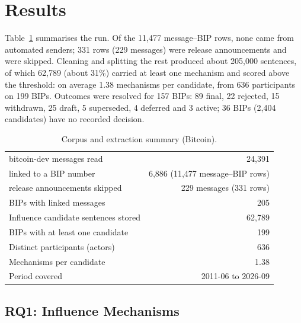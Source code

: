 \section{Results}
\label{sec:results}

Table~\ref{tab:corpus} summarises the run. Of the 11,477 message--BIP rows, none came from automated senders; 331 rows (229 messages) were release announcements and were skipped. Cleaning and splitting the rest produced about 205,000 sentences, of which 62,789 (about 31\%) carried at least one mechanism and scored above the threshold: on average 1.38 mechanisms per candidate, from 636 participants on 199 BIPs. Outcomes were resolved for 157 BIPs: 89 final, 22 rejected, 15 withdrawn, 25 draft, 5 superseded, 4 deferred and 3 active; 36 BIPs (2,404 candidates) have no recorded decision.

\begin{table}[t]
\caption{Corpus and extraction summary (Bitcoin).}
\label{tab:corpus}
\small
\begin{tabular}{lr}
\toprule
bitcoin-dev messages read & 24,391 \\
\quad linked to a BIP number & 6,886 (11,477 message--BIP rows) \\
\quad release announcements skipped & 229 messages (331 rows) \\
BIPs with linked messages & 205 \\
Influence candidate sentences stored & 62,789 \\
BIPs with at least one candidate & 199 \\
Distinct participants (actors) & 636 \\
Mechanisms per candidate & 1.38 \\
Period covered & 2011-06 to 2026-09 \\
\bottomrule
\end{tabular}
\end{table}

\subsection{RQ1: Influence Mechanisms}

